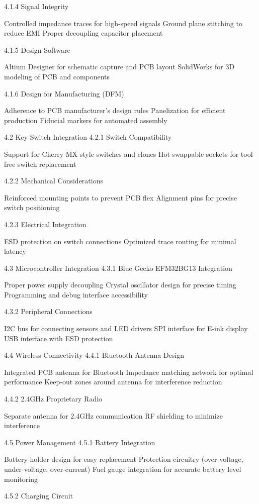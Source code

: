 \documentclass[a4paper,11pt]{article}%
\begin{document}
4.1.4 Signal Integrity

Controlled impedance traces for high-speed signals
Ground plane stitching to reduce EMI
Proper decoupling capacitor placement

4.1.5 Design Software

Altium Designer for schematic capture and PCB layout
SolidWorks for 3D modeling of PCB and components

4.1.6 Design for Manufacturing (DFM)

Adherence to PCB manufacturer's design rules
Panelization for efficient production
Fiducial markers for automated assembly

4.2 Key Switch Integration
4.2.1 Switch Compatibility

Support for Cherry MX-style switches and clones
Hot-swappable sockets for tool-free switch replacement

4.2.2 Mechanical Considerations

Reinforced mounting points to prevent PCB flex
Alignment pins for precise switch positioning

4.2.3 Electrical Integration

ESD protection on switch connections
Optimized trace routing for minimal latency

4.3 Microcontroller Integration
4.3.1 Blue Gecko EFM32BG13 Integration

Proper power supply decoupling
Crystal oscillator design for precise timing
Programming and debug interface accessibility

4.3.2 Peripheral Connections

I2C bus for connecting sensors and LED drivers
SPI interface for E-ink display
USB interface with ESD protection

4.4 Wireless Connectivity
4.4.1 Bluetooth Antenna Design

Integrated PCB antenna for Bluetooth
Impedance matching network for optimal performance
Keep-out zones around antenna for interference reduction

4.4.2 2.4GHz Proprietary Radio

Separate antenna for 2.4GHz communication
RF shielding to minimize interference

4.5 Power Management
4.5.1 Battery Integration

Battery holder design for easy replacement
Protection circuitry (over-voltage, under-voltage, over-current)
Fuel gauge integration for accurate battery level monitoring

4.5.2 Charging Circuit
\end{document}

